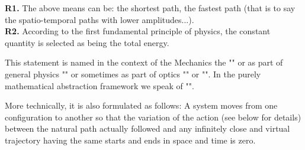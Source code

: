	\begin{tcolorbox}[title=Remarks,colframe=black,arc=10pt]
	\textbf{R1.} The above means can be: the shortest path, the fastest path (that is to say the spatio-temporal paths with lower amplitudes...).\\
	
	\textbf{R2.} According to the first fundamental principle of physics, the constant quantity is selected as being the total energy.
	\end{tcolorbox}
	This statement is named in the context of the Mechanics the "" or as part of general physics "" or sometimes as part of optics "" or "". In the purely mathematical abstraction framework we speak of "".
	
	More technically, it is also formulated as follows: A system moves from one configuration to another so that the variation of the action (see below for details) between the natural path actually followed and any infinitely close and virtual trajectory having the same starts and ends in space and time is zero.
	

